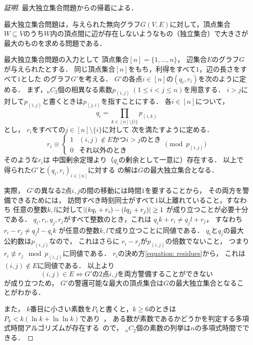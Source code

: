 \begin{proof}[証明]
最大独立集合問題からの帰着による．

最大独立集合問題は，与えられた無向グラフ$G(V, E)$に対して，頂点集合$W \subseteq V$のうち$W$内の頂点間に辺が存在しないようなもの（独立集合）で大きさが最大のものを求める問題である．

\newcommand{\primenum}[2]{p_{(#1,#2)}}
最大独立集合問題の入力として
頂点集合$[n] = \{1, \ldots, n\}$，
辺集合$E$のグラフ$G$が与えられたとする．
同じ頂点集合$[n]$をもち，利得をすべて$1$，辺の長さをすべて$1$とした
{\graphUnit}のグラフ$G'$を考える．
$G'$の各点$i \in [n]$の{\exactIdletime}$(q_i, r_i)$を次のように定める．
まず，${}_n C_2$個の相異なる素数$\primenum{i}{j}\ (1 \leq i < j \leq n)$を用意する．
$i > j$に対して$\primenum{i}{j}$と書くときは$\primenum{j}{i}$を指すことにする．
各$i \in [n]$について，
\begin{equation}
  q_i = \prod_{k \in [n] \setminus \{i\}} \primenum{i}{k}
\end{equation}
とし，
$r _i$をすべての$j \in [n] \setminus \{i\}$に対して
次を満たすように定める．
\begin{equation}
\label{equation: residues}
  r _i
 \equiv
  \begin{cases}
    1 & \text{$(i, j) \notin E$かつ$i > j$のとき} \\
    0 & \text{それ以外のとき}
  \end{cases}
 \pmod{p _{(i, j)}}
\end{equation}
そのような$r _i$は
中国剰余定理より（$q _i$の剰余として一意に）存在する．
以上で得られた$G'$と$(q _i, r _i) _{i \in [n]}$に対する
{\timeSpecifiedPatProb}の解は$G$の最大独立集合となる．

実際，
$G'$の異なる2点$i, j$の間の移動には時間$1$を要することから，
その両方を警備できるためには，
訪問すべき時刻同士がすべて$1$以上離れていること，すなわち
任意の整数$k, l$に対して$\lvert{(k q_i + r_i) - (l q_j + r_j)}\rvert \geq 1$%
が成り立つことが必要十分である．
$q_i, r_i, q_j, r_j$がすべて整数のとき，これは
$q_i k + r_i \neq q_j l + r_j$，
すなわち
$r_i - r_j \neq q_j l - q_i k$%
が任意の整数$k, l$で成り立つことに同値である．
$q _i$と$q _j$の最大公約数は$p _{(i, j)}$なので，
これはさらに
$r_i - r_j$が$p _{(i, j)}$の倍数でないこと，
つまり$r_i \not\equiv r_j \mod p _{(i, j)}$に同値である．
$r_i$の決め方\eqref{equation: residues}から，
これは$(i, j) \notin E$に同値である．
以上より
\[
  (i, j) \in E \iff \text{$G'$の2点$i, j$を両方警備することができない}
\]
が成り立つため，
$G'$の警邏可能な最大の頂点集合は$G$の最大独立集合となることがわかる．

また，
$k$番目に小さい素数を$P_k$と書くと，$k \geq 6$のときは
$P_k < k( \ln k + \ln\ln k )$であり~\cite{dusart1999k}，
ある数が素数であるかどうかを判定する多項式時間アルゴリズムが存在する~\cite{agrawal2004primes}ので，
${}_n C_2$個の素数の列挙は$n$の多項式時間でできる．
\end{proof}





